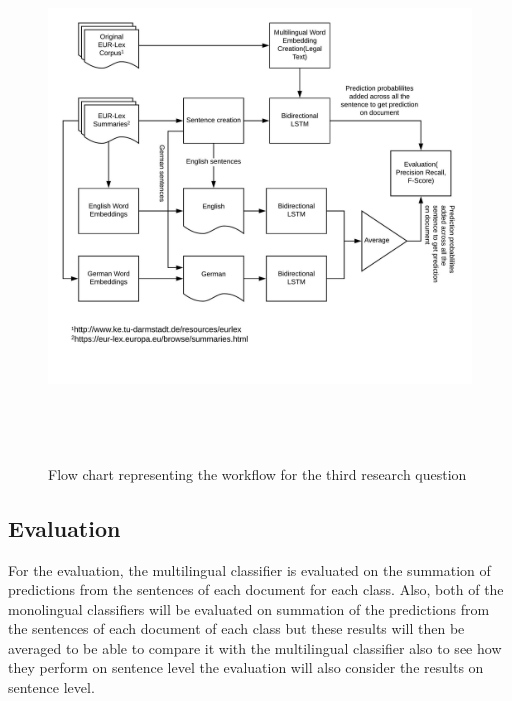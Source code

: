 \begin{figure}[!ht]
    \centering
    \includegraphics[width=15cm, height=14cm,keepaspectratio]{pics/flowforQuestion3.jpeg}
    \captionsetup{justification=centering,margin=1cm}
    \caption{Flow chart representing the workflow for the third research question}
    \label{fig:FlowResearchQuestion3}
\end{figure}

\clearpage


\subsection*{Evaluation}

For the evaluation, the multilingual classifier is evaluated on the summation of predictions from the sentences of each document for each class. Also, both of the monolingual classifiers will be evaluated on summation of the predictions from the sentences of each document of each class but these results will then be averaged to be able to compare it with the multilingual classifier also to see how they perform on sentence level the evaluation will also consider the results on sentence level.

